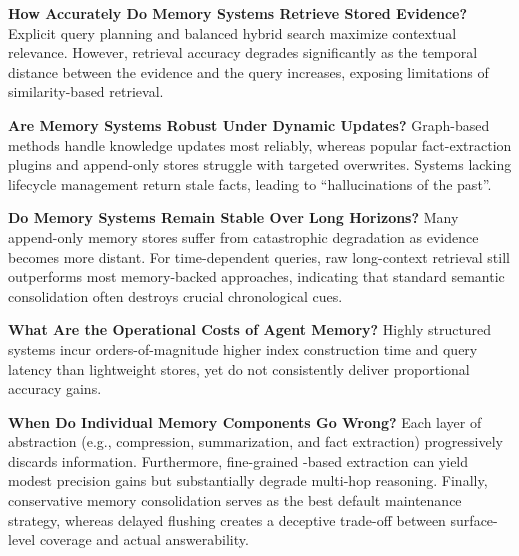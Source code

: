 \noindent
{} \textbf{How Accurately Do Memory Systems Retrieve Stored Evidence?} Explicit query planning and balanced hybrid search maximize contextual relevance. However, retrieval accuracy degrades significantly as the temporal distance between the evidence and the query increases, exposing limitations of similarity-based retrieval.

\noindent
{} \textbf{Are Memory Systems Robust Under Dynamic Updates?} Graph-based methods handle knowledge updates most reliably, whereas popular fact-extraction plugins and append-only stores struggle with targeted overwrites. Systems lacking lifecycle management return stale facts, leading to ``hallucinations of the past''.

\noindent
{} \textbf{Do Memory Systems Remain Stable Over Long Horizons?} Many append-only memory stores suffer from catastrophic degradation as evidence becomes more distant. For time-dependent queries, raw long-context retrieval still outperforms most memory-backed approaches, indicating that standard semantic consolidation often destroys crucial chronological cues.

\noindent
{} \textbf{What Are the Operational Costs of Agent Memory?} Highly structured systems incur orders-of-magnitude higher index construction time and query latency than lightweight stores, yet do not consistently deliver proportional accuracy gains.

\noindent
{} \textbf{When Do Individual Memory Components Go Wrong?} Each layer of abstraction (e.g., compression, summarization, and fact extraction) progressively discards information. Furthermore, fine-grained \llm-based extraction can yield modest precision gains but substantially degrade multi-hop reasoning. Finally, conservative memory consolidation serves as the best default maintenance strategy, whereas delayed flushing creates a deceptive trade-off between surface-level coverage and actual answerability.



